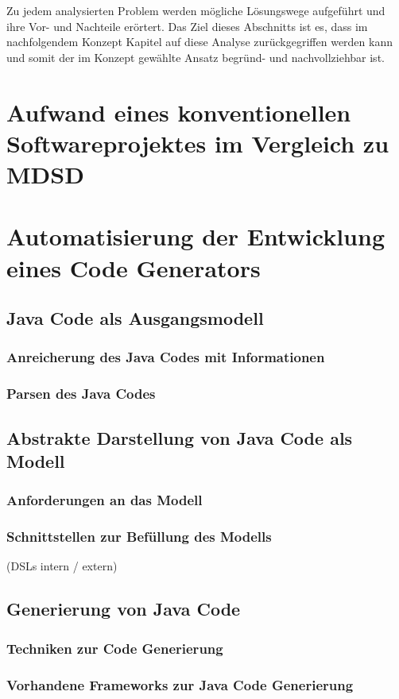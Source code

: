 \documentclass[12pt,oneside,a4paper,parskip]{scrbook}
\begin{document}
Zu jedem analysierten Problem werden mögliche Lösungswege aufgeführt und ihre Vor- und Nachteile erörtert. Das Ziel dieses Abschnitts ist es, dass im nachfolgendem Konzept Kapitel auf diese Analyse zurückgegriffen werden kann und somit der im Konzept gewählte Ansatz begründ- und nachvollziehbar ist.

\section{Aufwand eines konventionellen Softwareprojektes im Vergleich zu MDSD}



\section{Automatisierung der Entwicklung eines Code Generators}
\subsection{Java Code als Ausgangsmodell}
\subsubsection{Anreicherung des Java Codes mit Informationen}
\subsubsection{Parsen des Java Codes}
\subsection{Abstrakte Darstellung von Java Code als Modell}
\subsubsection{Anforderungen an das Modell}
\subsubsection{Schnittstellen zur Befüllung des Modells}
(DSLs intern / extern)
\subsection{Generierung von Java Code}
\subsubsection{Techniken zur Code Generierung}
\subsubsection{Vorhandene Frameworks zur Java Code Generierung}
\end{document}

